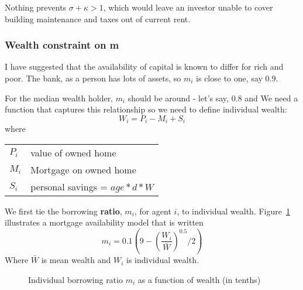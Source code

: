 Nothing prevents $\sigma+\kappa >1$, which would leave an investor unable to cover building maintenance and taxes out of current rent. 



\subsubsection{Wealth constraint on m} \label{SS:MWealthConstraint}


I have suggested that the availability of  capital is known to differ for rich and poor. 
The bank, as a person has lots of assets, so $m_i$ is close to one, say 0.9. 

For the median wealth holder, $m_i$ should be around - let's say, 0.8 and  
We need a function that captures this relationship so we need to define individual wealth:
\[W_i= P_i -M_i  +S_i\]
where 

\begin{tabular}{ll}
$P_i$ & value of owned home\\
$M_i$ & Mortgage on owned home\\
$S_i$ & personal savings = $age*d*W$\\
\end{tabular}


We first tie the borrowing \textbf{ratio}, $m_i$,  for agent $i$, to individual wealth. Figure~\ref{Fig:Borrowingratio} illustrates a mortgage availability  model that is written 
 \[ m_i = 0.1(9-\left(\frac{W_i}{\bar W}\right)^{0.5}/2 )\]
Where $\bar{W}$ is mean wealth and $W_i$ is individual wealth. 

\begin{figure}[htb]
\caption{Individual borrowing ratio $m_i$ as a function of wealth (in tenths)}
 \label{Fig:Borrowingratio}
\end{figure}


